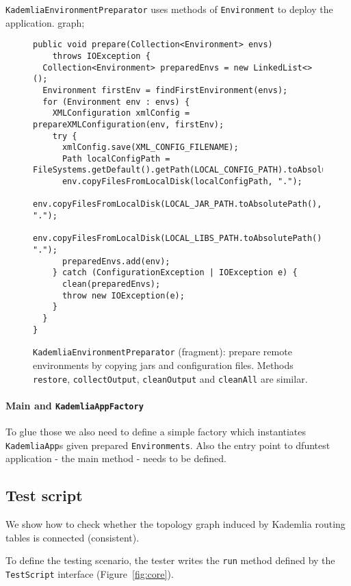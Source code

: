 \texttt{KademliaEnvironmentPreparator} uses methods of \texttt{Environment} to deploy the application.
graph;
\begin{figure}[tbp]
\begin{lstlisting}
public void prepare(Collection<Environment> envs)
    throws IOException {
  Collection<Environment> preparedEnvs = new LinkedList<>();
  Environment firstEnv = findFirstEnvironment(envs);
  for (Environment env : envs) {
    XMLConfiguration xmlConfig = prepareXMLConfiguration(env, firstEnv);
    try {
      xmlConfig.save(XML_CONFIG_FILENAME);
      Path localConfigPath = FileSystems.getDefault().getPath(LOCAL_CONFIG_PATH).toAbsolutePath();
      env.copyFilesFromLocalDisk(localConfigPath, ".");
      env.copyFilesFromLocalDisk(LOCAL_JAR_PATH.toAbsolutePath(), ".");
      env.copyFilesFromLocalDisk(LOCAL_LIBS_PATH.toAbsolutePath(), ".");
      preparedEnvs.add(env);
    } catch (ConfigurationException | IOException e) {
      clean(preparedEnvs);
      throw new IOException(e);
    }
  }
}
\end{lstlisting}
\caption{\texttt{KademliaEnvironmentPreparator} (fragment): prepare remote environments by copying jars and configuration files. Methods \texttt{restore}, \texttt{collectOutput}, \texttt{cleanOutput} and \texttt{cleanAll} are similar.}
\label{fig:prepare}
\end{figure}


\paragraph{Main and \texttt{KademliaAppFactory}} To glue those we also need to
define a simple factory which instantiates \texttt{KademliaApp}s given prepared
\texttt{Environments}. Also the entry point to dfuntest application - the main
method - needs to be defined.

\subsection{Test script}

We show how to check whether the topology graph induced by Kademlia routing
tables is connected (consistent).

To define the testing scenario, the tester writes the \texttt{run} method defined by the
\texttt{TestScript} interface (Figure~\ref{fig:core}).

